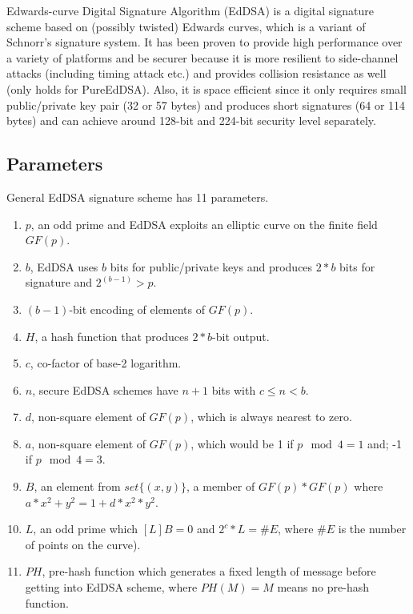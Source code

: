 \documentclass[10pt,sigconf]{acmart}
\begin{document}
Edwards-curve Digital Signature Algorithm (EdDSA) is a digital signature scheme based on (possibly twisted) Edwards curves, which is a variant of Schnorr's signature system. It has been proven to provide high performance over a variety of platforms and be securer because it is more resilient to side-channel attacks (including timing attack etc.) and provides collision resistance as well (only holds for PureEdDSA). Also, it is space efficient since it only requires small public/private key pair (32 or 57 bytes) and produces short signatures (64 or 114 bytes) and can achieve around 128-bit and 224-bit security level separately.

\subsection{Parameters}

General EdDSA signature scheme has 11 parameters.

\begin{enumerate}
    \item $p$, an odd prime and EdDSA exploits an elliptic curve on the finite field $GF(p)$.
    \item $b$, EdDSA uses $b$ bits for public/private keys and produces $2*b$ bits for signature and $2^{(b-1)} > p$.
    \item $(b-1)$-bit encoding of elements of $GF(p)$.
    \item $H$, a hash function that produces $2*b$-bit output.
    \item $c$, co-factor of base-2 logarithm.
    \item $n$, secure EdDSA schemes have $n+1$ bits with $c \leq n < b$.
    \item $d$, non-square element of $GF(p)$, which is always nearest to zero.
    \item $a$, non-square element of $GF(p)$, which would be 1 if $p \mod 4 = 1$ and; -1 if $p \mod 4 = 3$.
    \item $B$, an element from $set\{(x,y)\}$, a member of $GF(p)*GF(p)$ where $a * x^2 + y^2 = 1 + d * x^2 * y^2$.
    \item $L$, an odd prime which $[L]B = 0$ and $2^c * L = \#E$, where $\#E$ is the number of points on the curve).
    \item $PH$, pre-hash function which generates a fixed length of message before getting into EdDSA scheme, where $PH(M) = M$ means no pre-hash function.
\end{enumerate}
\end{document}

